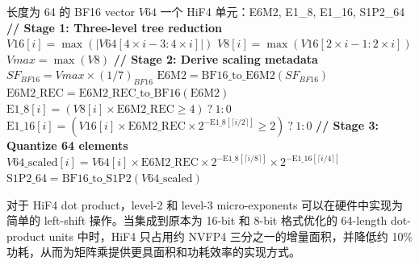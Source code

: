 \documentclass{article}
\begin{document}
\begin{algorithm}[h]
\caption{从 BF16 转换为 HiF4}
\label{alg:bf16-to-hif4}
\begin{algorithmic}[1]
\REQUIRE 长度为 64 的 BF16 vector $V64$
\ENSURE 一个 HiF4 单元：E6M2, E1\_8, E1\_16, S1P2\_64
\STATE \textbf{// Stage 1: Three-level tree reduction}
  \STATE $V16[i] = \max(|V64[4 \times i - 3 : 4 \times i]|)$
\ENDFOR
{}
  \STATE $V8[i] = \max(V16[2 \times i - 1 : 2 \times i])$
\ENDFOR
\STATE $Vmax = \max(V8)$
\STATE \textbf{// Stage 2: Derive scaling metadata}
\STATE $SF_{BF16} = Vmax \times (1/7)_{BF16}$
  \hfill{}
\STATE $\text{E6M2} = \text{BF16\_to\_E6M2}(SF_{BF16})$
  \hfill{}
\STATE $\text{E6M2\_REC} = \text{E6M2\_REC\_to\_BF16}(\text{E6M2})$
  \hfill{}
\STATE $\text{E1\_8}[i] = (V8[i] \times \text{E6M2\_REC} \geq 4)\ ?\ 1 : 0$
  \hfill{}
  \STATE $\text{E1\_16}[i] = (V16[i] \times \text{E6M2\_REC} \times 2^{-\text{E1\_8}[\lceil i/2 \rceil]} \geq 2)\ ?\ 1 : 0$
\ENDFOR
\STATE \textbf{// Stage 3: Quantize 64 elements}
  \STATE $V64\_\text{scaled}[i] = V64[i] \times \text{E6M2\_REC} \times 2^{-\text{E1\_8}[\lceil i/8 \rceil]} \times 2^{-\text{E1\_16}[\lceil i/4 \rceil]}$
\ENDFOR
\STATE $\text{S1P2\_64} = \text{BF16\_to\_S1P2}(V64\_\text{scaled})$
  \hfill{}
\end{algorithmic}
\end{algorithm}

对于 HiF4 dot product，level-2 和 level-3 micro-exponents 可以在硬件中实现为简单的 left-shift 操作。当集成到原本为
16-bit 和 8-bit 格式优化的 64-length dot-product units 中时，HiF4 只占用约 NVFP4 三分之一的增量面积，并降低约
10\% 功耗，从而为矩阵乘提供更具面积和功耗效率的实现方式。



\newpage

\end{document}
